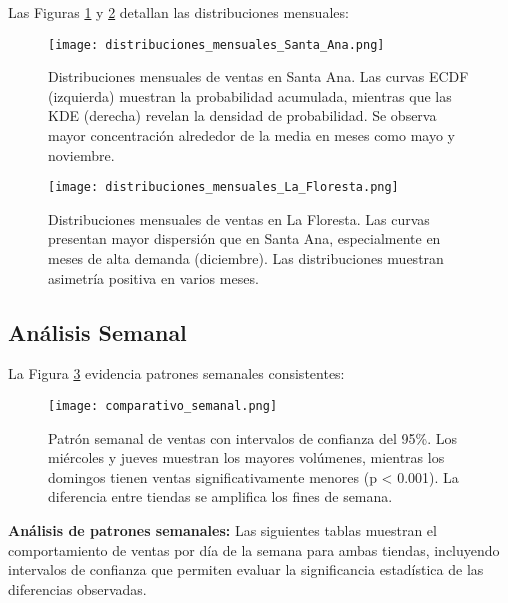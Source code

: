 \documentclass[12pt]{article}
\begin{document}
Las Figuras \ref{fig:dist_mensual_sa} y \ref{fig:dist_mensual_lf} detallan las distribuciones mensuales:

\begin{figure}[H]
\centering
\texttt{[image: distribuciones\_mensuales\_Santa\_Ana.png]}
\caption{Distribuciones mensuales de ventas en Santa Ana. Las curvas ECDF (izquierda) muestran la probabilidad acumulada, mientras que las KDE (derecha) revelan la densidad de probabilidad. Se observa mayor concentración alrededor de la media en meses como mayo y noviembre.}
\label{fig:dist_mensual_sa}
\end{figure}

\begin{figure}[H]
\centering
\texttt{[image: distribuciones\_mensuales\_La\_Floresta.png]}
\caption{Distribuciones mensuales de ventas en La Floresta. Las curvas presentan mayor dispersión que en Santa Ana, especialmente en meses de alta demanda (diciembre). Las distribuciones muestran asimetría positiva en varios meses.}
\label{fig:dist_mensual_lf}
\end{figure}

\subsection{Análisis Semanal}

La Figura \ref{fig:comp_semanal} evidencia patrones semanales consistentes:

\begin{figure}[H]
\centering
\texttt{[image: comparativo\_semanal.png]}
\caption{Patrón semanal de ventas con intervalos de confianza del 95\%. Los miércoles y jueves muestran los mayores volúmenes, mientras los domingos tienen ventas significativamente menores (p < 0.001). La diferencia entre tiendas se amplifica los fines de semana.}
\label{fig:comp_semanal}
\end{figure}

\textbf{Análisis de patrones semanales:} Las siguientes tablas muestran el comportamiento de ventas por día de la semana para ambas tiendas, incluyendo intervalos de confianza que permiten evaluar la significancia estadística de las diferencias observadas.
\end{document}
